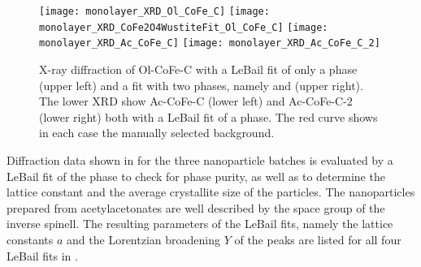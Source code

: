 \documentclass[\main/dresen_thesis.tex]{subfiles}
\begin{document}
  \label{sec:monolayers:nanoparticle:xrd}
  \begin{figure}[tb]
    \centering
    \texttt{[image: monolayer\_XRD\_Ol\_CoFe\_C]}
    \texttt{[image: monolayer\_XRD\_CoFe2O4WustiteFit\_Ol\_CoFe\_C]}
    \texttt{[image: monolayer\_XRD\_Ac\_CoFe\_C]}
    \texttt{[image: monolayer\_XRD\_Ac\_CoFe\_C\_2]}
    \caption{\label{fig:monolayers:nanoparticle:xrd}X-ray diffraction of Ol-CoFe-C with a LeBail fit of only a  phase (upper left) and a fit with two phases, namely  and  (upper right). The lower XRD show Ac-CoFe-C (lower left) and Ac-CoFe-C-2 (lower right) both with a LeBail fit of a  phase. The red curve shows in each case the manually selected background.}
  \end{figure}

  Diffraction data shown in  for the three nanoparticle batches is evaluated by a LeBail fit of the phase to check for phase purity, as well as to determine the lattice constant and the average crystallite size of the particles.
  The nanoparticles prepared from acetylacetonates are well described by the space group of the inverse spinell.
  The resulting parameters of the LeBail fits, namely the lattice constants $a$ and the Lorentzian broadening $Y$ of the peaks are listed for all four LeBail fits in .
\end{document}
